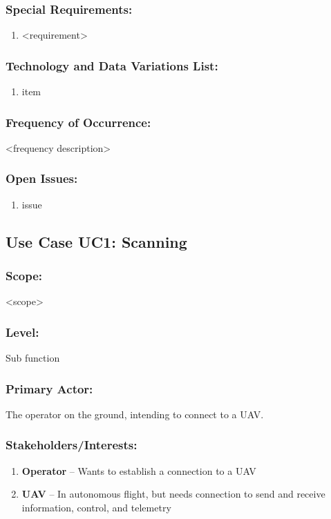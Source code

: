 \documentclass[ProductRequirements.tex]{subfiles}
\begin{document}
		\subsubsection*{Special Requirements:}
			\begin{enumerate}\itemsep1pt
				\item <requirement>
			\end{enumerate}
		\subsubsection*{Technology and Data Variations List:}
			\begin{enumerate}\itemsep1pt
				\item item
			\end{enumerate}
		\subsubsection*{Frequency of Occurrence:}
			<frequency description>
		\subsubsection*{Open Issues:}
			\begin{enumerate}\itemsep1pt
				\item issue
			\end{enumerate}
			

	\subsection{Use Case UC1: Scanning}
		\subsubsection*{Scope:}
			<scope>
		\subsubsection*{Level:}
			Sub function
		\subsubsection*{Primary Actor:}
			The operator on the ground, intending to connect to a UAV.
		\subsubsection*{Stakeholders/Interests:}
			\begin{enumerate}\itemsep1pt
				\item \textbf{Operator} -- Wants to establish a connection to a UAV
				\item \textbf{UAV} -- In autonomous flight, but needs connection to send and receive information, control, and telemetry
			\end{enumerate}
\end{document}
